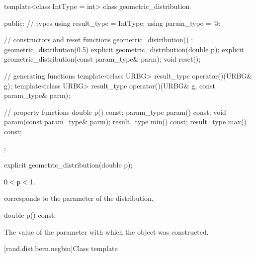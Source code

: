 %
%
\begin{codeblock}
template<class IntType = int>
  class geometric_distribution {
  public:
    // types
    using result_type = IntType;
    using param_type  = @\unspec@;

    // constructors and reset functions
    geometric_distribution() : geometric_distribution(0.5) {}
    explicit geometric_distribution(double p);
    explicit geometric_distribution(const param_type& parm);
    void reset();

    // generating functions
    template<class URBG>
      result_type operator()(URBG& g);
    template<class URBG>
      result_type operator()(URBG& g, const param_type& parm);

    // property functions
    double p() const;
    param_type param() const;
    void param(const param_type& parm);
    result_type min() const;
    result_type max() const;
  };
\end{codeblock}


%
\begin{itemdecl}
explicit geometric_distribution(double p);
\end{itemdecl}

\begin{itemdescr}
\pnum
\expects
$0 < \texttt{p} < 1$.

\pnum
\remarks
 corresponds to the parameter of the distribution.
\end{itemdescr}

%
\begin{itemdecl}
double p() const;
\end{itemdecl}

\begin{itemdescr}
\pnum
\returns
The value of the  parameter
 with which the object was constructed.
\end{itemdescr}


[rand.dist.bern.negbin]{Class template }
%
%

